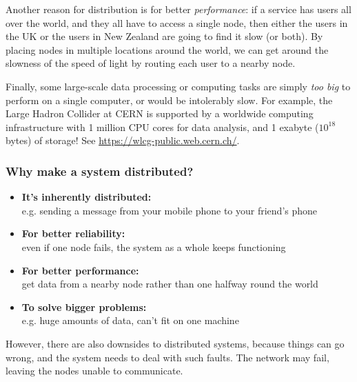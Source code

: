 Another reason for distribution is for better \emph{performance}: if a service has users all over the world, and they all have to access a single node, then either the users in the UK or the users in New Zealand are going to find it slow (or both).
By placing nodes in multiple locations around the world, we can get around the slowness of the speed of light by routing each user to a nearby node.

Finally, some large-scale data processing or computing tasks are simply \emph{too big} to perform on a single computer, or would be intolerably slow.
For example, the Large Hadron Collider at CERN is supported by a worldwide computing infrastructure with 1 million CPU cores for data analysis, and 1 exabyte ($10^{18}$ bytes) of storage! See \url{https://wlcg-public.web.cern.ch/}.

\begin{frame}
    \label{s:why-distribute}
    \frametitle{Why make a system distributed?}
    \begin{itemize}\pause
        \item \textbf{It's inherently distributed:}\\e.g. sending a message from your mobile phone to your friend's phone\pause
        \item \textbf{For better reliability:}\\even if one node fails, the system as a whole keeps functioning\pause
        \item \textbf{For better performance:}\\get data from a nearby node rather than one halfway round the world\pause
        \item \textbf{To solve bigger problems:}\\e.g. huge amounts of data, can't fit on one machine
    \end{itemize}
\end{frame}

However, there are also downsides to distributed systems, because things can go wrong, and the system needs to deal with such faults.
The network may fail, leaving the nodes unable to communicate.

